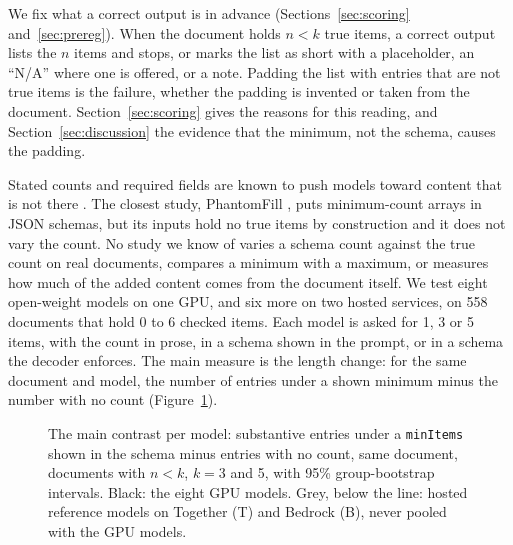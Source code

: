 We fix what a correct output is in advance (Sections~\ref{sec:scoring} and~\ref{sec:prereg}).
When the document holds $n < k$ true items, a correct output lists the $n$ items and stops, or marks the list as short with a placeholder, an ``N/A'' where one is offered, or a note.
Padding the list with entries that are not true items is the failure, whether the padding is invented or taken from the document.
Section~\ref{sec:scoring} gives the reasons for this reading, and Section~\ref{sec:discussion} the evidence that the minimum, not the schema, causes the padding.

Stated counts and required fields are known to push models toward content that is not there \citep{yang2026prompt,ivgi2025loops,usman2026phantomfill}.
The closest study, PhantomFill \citep{usman2026phantomfill}, puts minimum-count arrays in JSON schemas, but its inputs hold no true items by construction and it does not vary the count.
No study we know of varies a schema count against the true count on real documents, compares a minimum with a maximum, or measures how much of the added content comes from the document itself.
We test eight open-weight models on one GPU, and six more on two hosted services, on 558 documents that hold 0 to 6 checked items.
Each model is asked for 1, 3 or 5 items, with the count in prose, in a schema shown in the prompt, or in a schema the decoder enforces.
The main measure is the length change: for the same document and model, the number of entries under a shown minimum minus the number with no count (Figure~\ref{fig:headline}).

\begin{figure}[t]
  \centering
  
  \caption{The main contrast per model: substantive entries under a \texttt{minItems} shown in the schema minus entries with no count, same document, documents with $n < k$, $k = 3$ and 5, with 95\% group-bootstrap intervals. Black: the eight GPU models. Grey, below the line: hosted reference models on Together (T) and Bedrock (B), never pooled with the GPU models.}
  \label{fig:headline}
\end{figure}

